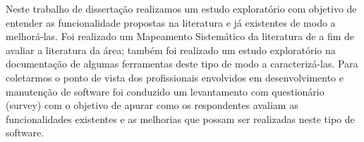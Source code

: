 Neste trabalho de dissertação realizamos um estudo exploratório com objetivo de
entender as funcionalidade propostas na literatura e já existentes de modo a
melhorá-las. Foi realizado um Mapeamento Sistemático da literatura de a fim de
avaliar a literatura da área; também foi realizado um estudo exploratório na
documentação de algumas ferramentas deste tipo de modo a caracterizá-las. Para
coletarmos o ponto de vista dos profissionais envolvidos em desenvolvimento e
manutenção de software foi conduzido um levantamento com questionário (survey)
com o objetivo de apurar como os respondentes  avaliam as funcionalidades
existentes e as melhorias que possam ser realizadas neste tipo de software.


